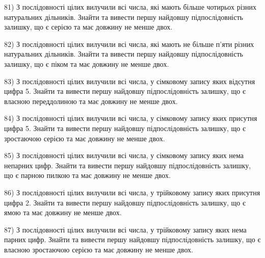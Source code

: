 \documentclass[11pt, ukrainian]{article}
\begin{document}
\par
\vspace{0.9cm}
81) \space 
З послідовності цілих вилучили всі числа, які мають більше чотирьох різних натуральних дільників. Знайти та вивести першу найдовшу підпослідовність залишку, що є серією та має довжину не менше двох.

\par
\vspace{0.9cm}
82) \space 
З послідовності цілих вилучили всі числа, які мають не більше п'яти різних натуральних дільників. Знайти та вивести першу найдовшу підпослідовність залишку, що є піком та має довжину не менше двох.

\par
\vspace{0.9cm}
83) \space 
З послідовності цілих вилучили всі числа, у сімковому запису яких відсутня цифра 5. Знайти та вивести першу найдовшу підпослідовність залишку, що є власною переддолиною та має довжину не менше двох.

\par
\vspace{0.9cm}
84) \space 
З послідовності цілих вилучили всі числа, у сімковому запису яких присутня цифра 5. Знайти та вивести першу найдовшу підпослідовність залишку, що є зростаючою серією та має довжину не менше двох.

\par
\vspace{0.9cm}
85) \space 
З послідовності цілих вилучили всі числа, у сімковому запису яких нема непарних цифр. Знайти та вивести першу найдовшу підпослідовність залишку, що є парною пилкою та має довжину не менше двох.

\par
\vspace{0.9cm}
86) \space 
З послідовності цілих вилучили всі числа, у трійковому запису яких присутня цифра 2. Знайти та вивести першу найдовшу підпослідовність залишку, що є ямою та має довжину не менше двох.

\par
\vspace{0.9cm}
87) \space 
З послідовності цілих вилучили всі числа, у трійковому запису яких нема парних цифр. Знайти та вивести першу найдовшу підпослідовність залишку, що є власною зростаючою серією та має довжину не менше двох.
\end{document}
